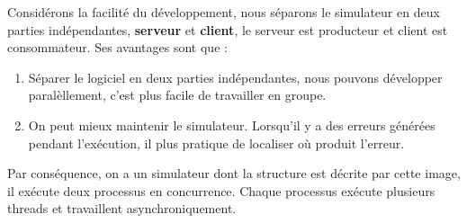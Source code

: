 \documentclass[14px]{article}
\begin{document}
	Considérons la facilité du développement, nous séparons le simulateur en deux parties indépendantes, \textbf{serveur} et \textbf{client}, le serveur est producteur et client est consommateur. Ses avantages sont que :
	\begin{enumerate}
		\item Séparer le logiciel en deux parties indépendantes, nous pouvons développer paralèllement, c'est plus facile de travailler en groupe.
		\item On peut mieux maintenir le simulateur. Lorsqu'il y a des erreurs générées pendant l'exécution, il plus pratique de localiser où produit l'erreur.
	\end{enumerate}

	Par conséquence, on a un simulateur dont la structure est décrite par cette image, il exécute deux processus en concurrence. Chaque processus exécute plusieurs threads et travaillent asynchroniquement.

	\begin{figure}[htbp]
	\end{figure}
\end{document}
